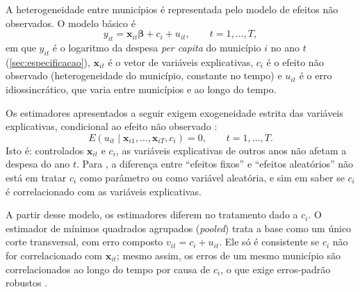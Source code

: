 A heterogeneidade entre municípios é representada pelo modelo de efeitos não observados. O modelo básico \parencite[p.~251]{wooldridge2002} é
\begin{equation}\label{eq:uem}
y_{it} = \mathbf{x}_{it}\boldsymbol{\beta} + c_i + u_{it}, \qquad t = 1, \dots, T,
\end{equation}
em que $y_{it}$ é o logaritmo da despesa \textit{per capita} do município $i$ no ano $t$ (\autoref{sec:especificacao}), $\mathbf{x}_{it}$ é o vetor de variáveis explicativas, $c_i$ é o efeito não observado (heterogeneidade do município, constante no tempo) e $u_{it}$ é o erro idiossincrático, que varia entre municípios e ao longo do tempo.

Os estimadores apresentados a seguir exigem exogeneidade estrita das variáveis explicativas, condicional ao efeito não observado \parencite[p.~253]{wooldridge2002}:
\begin{equation}\label{eq:exog}
E(u_{it} \mid \mathbf{x}_{i1}, \dots, \mathbf{x}_{iT}, c_i) = 0, \qquad t = 1, \dots, T.
\end{equation}
Isto é: controlados $\mathbf{x}_{it}$ e $c_i$, as variáveis explicativas de outros anos não afetam a despesa do ano $t$. Para \textcite[p.~251--252]{wooldridge2002}, a diferença entre ``efeitos fixos'' e ``efeitos aleatórios'' não está em tratar $c_i$ como parâmetro ou como variável aleatória, e sim em saber se $c_i$ é correlacionado com as variáveis explicativas.

A partir desse modelo, os estimadores diferem no tratamento dado a $c_i$. O estimador de mínimos quadrados agrupados (\textit{pooled}) trata a base como um único corte transversal, com erro composto $v_{it} = c_i + u_{it}$. Ele só é consistente se $c_i$ não for correlacionado com $\mathbf{x}_{it}$; mesmo assim, os erros de um mesmo município são correlacionados ao longo do tempo por causa de $c_i$, o que exige erros-padrão robustos \parencite[p.~256--257]{wooldridge2002}.

